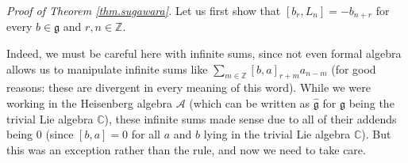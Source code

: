 \documentclass
[numbers=enddot,12pt,final,onecolumn,german,notitlepage]{scrartcl}%
\theoremstyle{definition}
\begin{document}
\textit{Proof of Theorem \ref{thm.sugawara}.} Let us first show that $\left[
b_{r},L_{n}\right]  =-b_{n+r}$ for every $b\in\mathfrak{g}$ and $r,n\in
\mathbb{Z}$.

Indeed, we must be careful here with infinite sums, since not even formal
algebra allows us to manipulate infinite sums like $\sum\limits_{m\in
\mathbb{Z}}\left[  b,a\right]  _{r+m}a_{n-m}$ (for good reasons: these are
divergent in every meaning of this word). While we were working in the
Heisenberg algebra $\mathcal{A}$ (which can be written as
$\widehat{\mathfrak{g}}$ for $\mathfrak{g}$ being the trivial Lie algebra
$\mathbb{C}$), these infinite sums made sense due to all of their addends
being $0$ (since $\left[  b,a\right]  =0$ for all $a$ and $b$ lying in the
trivial Lie algebra $\mathbb{C}$). But this was an exception rather than the
rule, and now we need to take care.
\end{document}
